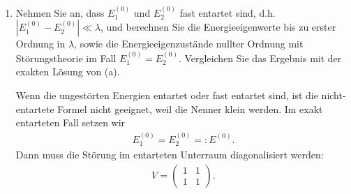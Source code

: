 \documentclass[11pt,a4paper]{scrartcl}
\newcommand{\abs}[1]{\left| #1 \right|}
\begin{document}
\begin{enumerate}[label=(\alph*)]
\begin{calculationbox}
            \begin{calculationbox}[title=Vergleich mit der exakten Lösung]
                Für $\abs\lambda\ll\abs\Delta$ wird die Wurzel aus Teil (a) entwickelt. Für $\Delta>0$ gilt
                \begin{align*}
                    \sqrt{\left(\frac{\Delta}{2}\right)^2+\lambda^2}
                    &=
                    \frac{\Delta}{2}\sqrt{1+\frac{4\lambda^2}{\Delta^2}}\\
                    &=
                    \frac{\Delta}{2}
                    \left(1+\frac{2\lambda^2}{\Delta^2}+\mathcal O(\lambda^4)\right)\\
                    &=
                    \frac{\Delta}{2}+\frac{\lambda^2}{\Delta}+\mathcal O(\lambda^4).
                \end{align*}
                Einsetzen in $E_\pm$ liefert genau die Energien aus der Störungstheorie. Die Entwicklung der exakten Eigenzustände liefert ebenfalls dieselben ersten Ordnungen.

                \begin{solutionbox}[title=Vergleich]
                    \begin{align*}
                        E_+=E_1^{(0)}+\lambda+\frac{\lambda^2}{\Delta}+\mathcal O(\lambda^4),
                        \qquad
                        E_-=E_2^{(0)}+\lambda-\frac{\lambda^2}{\Delta}+\mathcal O(\lambda^4).
                    \end{align*}
                \end{solutionbox}
            \end{calculationbox}
        \end{calculationbox}

        \item Nehmen Sie an, dass $E_1^{(0)}$ und $E_2^{(0)}$ fast entartet sind, d.h. $\abs{E_1^{(0)}-E_2^{(0)}}\ll \lambda$, und berechnen Sie die Energieeigenwerte bis zu erster Ordnung in $\lambda$, sowie die Energieeigenzustände nullter Ordnung mit Störungstheorie im Fall $E_1^{(0)}=E_2^{(0)}$. Vergleichen Sie das Ergebnis mit der exakten Lösung von (a).

        \begin{calculationbox}
            Wenn die ungestörten Energien entartet oder fast entartet sind, ist die nicht-entartete Formel nicht geeignet, weil die Nenner klein werden. Im exakt entarteten Fall setzen wir
            \begin{align*}
                E_1^{(0)}=E_2^{(0)}=:E^{(0)}.
            \end{align*}
            Dann muss die Störung im entarteten Unterraum diagonalisiert werden:
            \begin{align*}
                V=
                \begin{pmatrix}
                    1&1\\
                    1&1
                \end{pmatrix}.
            \end{align*}


\end{calculationbox}
\end{enumerate}
\end{document}

